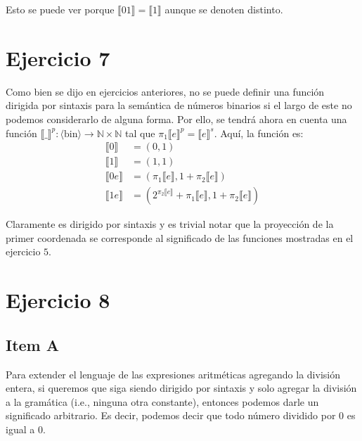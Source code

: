 \documentclass{article}
\newcommand{\aexp}[1]{\langle\text{#1}\rangle}
\newcommand{\sem}[1]{\llbracket #1\rrbracket}
\newcommand{\N}{\mathbb{N}}
\begin{document}
Esto se puede ver porque $\sem{01}=\sem{1}$ aunque se denoten distinto.

\section*{Ejercicio 7}
Como bien se dijo en ejercicios anteriores, no se puede definir una función dirigida por sintaxis para la semántica de números binarios si el largo de este no podemos considerarlo de alguna forma.
Por ello, se tendrá ahora en cuenta una función $\sem{\_}^p:\aexp{bin}\to\N\times\N$ tal que $\pi_1\sem{e}^p=\sem{e}^s$.
Aquí, la función es:
\begin{equation*}
	\begin{aligned}
		\sem{0}  & = (0, 1)                                                \\
		\sem{1}  & = (1, 1)                                                \\
		\sem{0e} & = (\pi_1\sem{e}, 1+\pi_2\sem{e})                        \\
		\sem{1e} & = (2^{\pi_2\sem{e}} + \pi_1{\sem{e}}, 1 + \pi_2\sem{e})
	\end{aligned}
\end{equation*}

Claramente es dirigido por sintaxis y es trivial notar que la proyección de la primer coordenada se corresponde al significado de las funciones mostradas en el ejercicio $5$.

\section*{Ejercicio 8}
\subsection*{Item A}
Para extender el lenguaje de las expresiones aritméticas agregando la división entera, si queremos que siga siendo dirigido por sintaxis y solo agregar la división a la gramática (i.e., ninguna otra constante), entonces podemos darle un significado arbitrario.
Es decir, podemos decir que todo número dividido por $0$ es igual a $0$.
\end{document}
